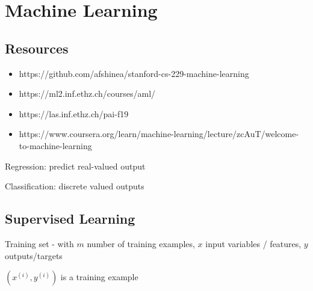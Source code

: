\chapter{Machine Learning}

\section{Resources}
\begin{itemize}
\item https://github.com/afshinea/stanford-cs-229-machine-learning
\item https://ml2.inf.ethz.ch/courses/aml/
\item https://las.inf.ethz.ch/pai-f19
\item https://www.coursera.org/learn/machine-learning/lecture/zcAuT/welcome-to-machine-learning
\end{itemize}

Regression: predict real-valued output

Classification: discrete valued outputs

\section{Supervised Learning}

Training set - with $m$ number of training examples, $x$ input variables / features, $y$ outputs/targets

$(x^{(i)},y^{(i)})$ is a training example

